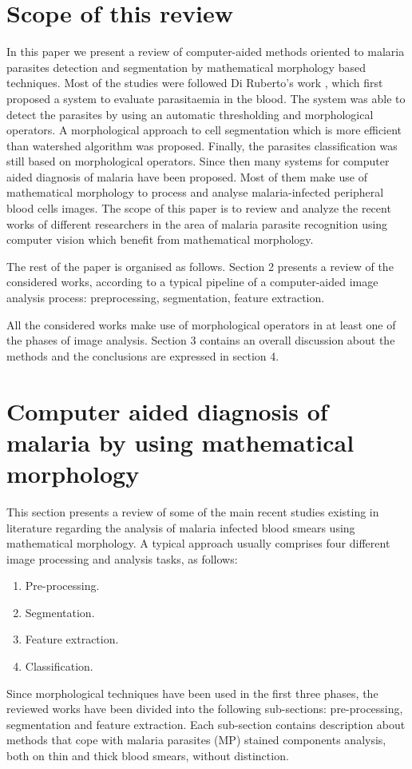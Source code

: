 \documentclass[sensors,review,submit,moreauthors,pdftex,10pt,a4paper]{mdpi}
\begin{document}
\section{Scope of this review}
In this paper we present a review of computer-aided methods oriented to malaria parasites detection and segmentation by mathematical morphology based techniques.
Most of the studies were followed Di Ruberto's work \cite{DiRuberto2002}, which first proposed a system to evaluate parasitaemia in the blood. The system was able to detect the parasites by using an automatic thresholding and morphological operators. A morphological approach to cell segmentation which is more efficient than watershed algorithm was proposed. Finally, the parasites classification was still based on morphological operators. Since then many systems for computer aided diagnosis of malaria have been proposed. Most of them make use of mathematical morphology to process and analyse malaria-infected peripheral blood cells images. The scope of this paper is to review and analyze the recent works of different researchers in the area of malaria parasite recognition using computer vision which benefit from mathematical morphology.

The rest of the paper is organised as follows. Section 2 presents a review of the considered works, according to a typical pipeline of a computer-aided image analysis process: preprocessing, segmentation, feature extraction.

All the considered works make use of morphological operators in at least one of the phases of image analysis. Section 3 contains an overall discussion about the methods and the conclusions are expressed in section 4.

\section{Computer aided diagnosis of malaria by using mathematical morphology}
This section presents a review of some of the main recent studies existing in literature regarding the analysis of malaria infected blood smears using mathematical morphology.
A typical approach usually comprises four different image processing and analysis tasks, as follows:
\begin{enumerate}
	\item Pre-processing.
	\item Segmentation.
	\item Feature extraction.
	\item Classification.
\end{enumerate}
Since morphological techniques have been used in the first three phases, the reviewed works have been divided into the following sub-sections: pre-processing, segmentation and feature extraction.
Each sub-section contains description about methods that cope with malaria parasites (MP) stained components analysis, both on thin and thick blood smears, without distinction.
\end{document}

